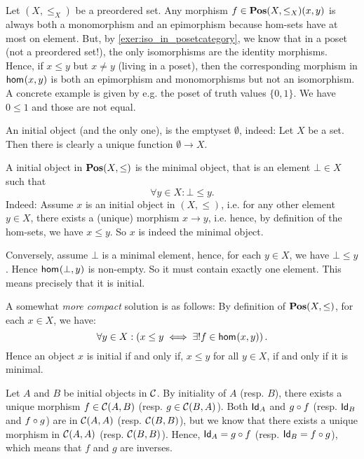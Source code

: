 \begin{solution}\label{sol:counterexample_monoepi_not_iso}
Let $(X,\leq_X)$ be a preordered set. Any morphism $f \in \POS(X,\leq_X)(x,y)$ is always both a monomorphism and an epimorphism because hom-sets have at most on element. But, by \cref{exer:iso_in_posetcategory}, we know that in a poset (not a preordered set!), the only isomorphisms are the identity morphisms. Hence, if $x\leq y$ but $x\not=y$ (living in a poset), then the corresponding morphism in $\Hom{x}{y}$ is both an epimorphism and monomorphisms but not an isomorphism.\\
A concrete example is given by e.g. the poset of truth values $\{0, 1\}$. We have $0\leq 1$ and those are not equal.
\end{solution}

\begin{solution} \label{sol:initial_set}
An initial object (and the only one), is the emptyset $\emptyset$, indeed: Let $X$ be a set. Then there is clearly a unique function $\emptyset\to X$.
\end{solution}

\begin{solution}\label{sol:initial_posetcat}
A initial object in $\POS(X,\leq)$ is the minimal object, that is an element $\bot\in X$ such that
\begin{equation}
\forall y\in X: \bot \leq y.
\end{equation}
Indeed: Assume $x$ is an initial object in $(X,\leq)$, i.e. for any other element $y\in X$, there exists a (unique) morphism $x\to y$, i.e. hence, by definition of the hom-sets, we have $x\leq y$. So $x$ is indeed the minimal object.

Conversely, assume $\bot$ is a minimal element, hence, for each $y\in X$, we have $\bot\leq y$. Hence $\Hom{\bot}{y}$ is non-empty. So it must contain exactly one element. This means precisely that it is initial.


A somewhat \textit{more compact} solution is as follows: By definition of $\POS(X,\leq)$, for each $x\in X$, we have:
\[
\forall y\in X: \left(x\leq y \iff \exists! f\in \Hom{x}{y}\right).
\]
Hence an object $x$ is initial if and only if, $x\leq y$ for all $y\in X$, if and only if it is minimal.
\end{solution}

\begin{solution}\label{sol:initial-unique}
Let $A$ and $B$ be initial objects in $\CC$. By initiality of $A$ (resp. $B$), there exists a unique morphism $f \in \CHom{\CC}{A}{B}$ (resp. $g \in \CHom{\CC}{B}{A}$). Both $\Id[A]$ and $\co{f}{g}$ (resp. $\Id[B]$ and $\co{g}{f}$) are in $\CHom{\CC}{A}{A}$ (resp. $\CHom{\CC}{B}{B}$), but we know that there exists a unique morphism in $\CHom{\CC}{A}{A}$ (resp. $\CHom{\CC}{B}{B}$). Hence, $\Id[A] = \co{f}{g}$ (resp. $\Id[B] = \co{g}{f}$), which means that $f$ and $g$ are inverses.
\end{solution}

